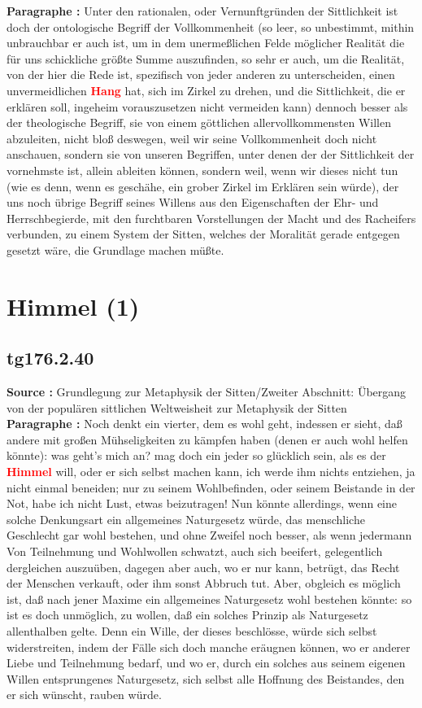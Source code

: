 \documentclass[a4paper,12pt,twoside]{book}
\newcommand{\match}[1]{\textcolor{red}{\textbf{#1}}}
\newcommand{\unnumberedsection}[1]{
	\section*{#1}
	\addcontentsline{toc}{section}{#1}
	\markright{#1}
}
\begin{document}
	\noindent\textbf{Paragraphe : }Unter den rationalen, oder Vernunftgründen der Sittlichkeit ist doch der ontologische Begriff der Vollkommenheit (so leer, so unbestimmt, mithin unbrauchbar er auch ist, um in dem unermeßlichen Felde möglicher Realität  die für uns schickliche größte Summe auszufinden, so sehr er auch, um die Realität, von der hier die Rede ist, spezifisch von jeder anderen zu unterscheiden, einen unvermeidlichen \match{Hang} hat, sich im Zirkel zu drehen, und die Sittlichkeit, die er erklären soll, ingeheim vorauszusetzen nicht vermeiden kann) dennoch besser als der theologische Begriff, sie von einem göttlichen allervollkommensten Willen abzuleiten, nicht bloß deswegen, weil wir seine Vollkommenheit doch nicht anschauen, sondern sie von unseren Begriffen, unter denen der der Sittlichkeit der vornehmste ist, allein ableiten können, sondern weil, wenn wir dieses nicht tun (wie es denn, wenn es geschähe, ein grober Zirkel im Erklären sein würde), der uns noch übrige Begriff seines Willens aus den Eigenschaften der Ehr- und Herrschbegierde, mit den furchtbaren Vorstellungen der Macht und des Racheifers verbunden, zu einem System der Sitten, welches der Moralität gerade entgegen gesetzt wäre, die Grundlage machen müßte. 
	
	\unnumberedsection{Himmel (1)} 
	\subsection*{tg176.2.40} 
	\textbf{Source : }Grundlegung zur Metaphysik der Sitten/Zweiter Abschnitt: Übergang von der populären sittlichen Weltweisheit zur Metaphysik der Sitten\\  
	
	\noindent\textbf{Paragraphe : }Noch denkt ein vierter, dem es wohl geht, indessen er sieht, daß andere mit großen Mühseligkeiten zu kämpfen haben (denen er auch wohl helfen könnte): was geht's mich an? mag doch ein jeder so glücklich sein, als es der \match{Himmel} will, oder er sich selbst machen kann, ich werde ihm nichts entziehen, ja nicht einmal beneiden; nur zu seinem Wohlbefinden, oder seinem Beistande in der Not, habe ich nicht Lust, etwas beizutragen! Nun könnte allerdings, wenn eine solche Denkungsart ein allgemeines Naturgesetz würde, das menschliche Geschlecht gar wohl bestehen, und ohne Zweifel noch besser, als wenn jedermann Von Teilnehmung und Wohlwollen schwatzt, auch sich beeifert, gelegentlich dergleichen auszuüben, dagegen aber auch, wo er nur kann, betrügt, das Recht der Menschen verkauft, oder ihm sonst Abbruch tut. Aber, obgleich es möglich ist, daß nach jener Maxime ein allgemeines Naturgesetz wohl bestehen könnte: so ist es doch unmöglich, zu wollen, daß ein solches Prinzip als Naturgesetz allenthalben gelte. Denn ein Wille, der dieses beschlösse, würde sich selbst widerstreiten, indem der Fälle sich doch manche eräugnen können, wo er anderer Liebe und Teilnehmung bedarf, und wo er, durch ein solches aus seinem eigenen Willen entsprungenes Naturgesetz, sich selbst alle Hoffnung des Beistandes, den er sich wünscht, rauben würde. 
	
\end{document}
